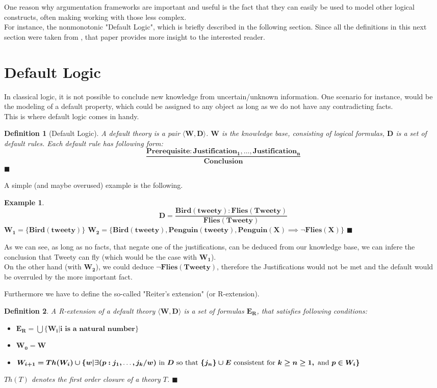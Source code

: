 \documentclass[12pt]{report}
\numberwithin{figure}{chapter}
\theoremstyle{break}
\newtheorem{defn}{Definition}[chapter]
\newtheorem{exmpl}{Example}[chapter]
\newenvironment{mydefn}{\begin{defn}}{$\blacksquare$ \end{defn}}
\newenvironment{myexmpl}{\begin{exmpl}}{$\blacksquare$ \end{exmpl}}
\begin{document}
One reason why argumentation frameworks are important and useful is the fact that they can easily be used to model other
logical constructs, often making working with those less complex.\\
For instance, the nonmonotonic "Default Logic", which is briefly described in the following section.
Since all the definitions in this next section were taken from \cite{Reiter}, that paper provides more insight to the interested reader.

\section{Default Logic}
In classical logic, it is not possible to conclude new knowledge from uncertain/unknown information. One scenario for instance, would be the modeling of a default property,
which could be assigned to any object as long as we do not have any contradicting facts.\\
This is where default logic comes in handy.

\begin{mydefn}[Default Logic]
A default theory is a pair $\bm{\langle W,D \rangle}$.
$\bm{W}$ is the knowledge base, consisting of logical formulas, $\bm{D}$ is a set of \textit{default rules}.
Each default rule has following form: \[\bm{\frac{Prerequisite : Justification_{1},\dots,Justification_{n}}{Conclusion}}\]
\end{mydefn}

A simple (and maybe overused) example is the following.
\begin{myexmpl}
\[\bm{D = \frac{Bird(tweety): Flies(Tweety)}{Flies(Tweety)}}\]
$\bm{W_{1} = \{Bird(tweety)\}}$
$\bm{W_{2} = \{Bird(tweety),Penguin(tweety),Penguin(X) \implies \lnot Flies(X)\}}$
\end{myexmpl}
As we can see, as long as no facts, that negate one of the justifications, can be deduced from our knowledge base, we can infere the conclusion that Tweety can fly
(which would be the case with $\bm{W_{1}}$).\\
On the other hand (with $\bm{W_{2}}$), we could deduce $\bm{\lnot Flies(Tweety)}$, therefore the Justifications would not be met and the default would be overruled by
the more important fact.

Furthermore we have to define the so-called "Reiter's extension" (or R-extension).
\begin{mydefn}
A R-extension of a default theory $\bm{\langle W,D \rangle}$ is a set of formulas $\bm{E_{R}}$, that satisfies following conditions:
\begin{itemize}
	\item{$\bm{E_{R} = \bigcup \{W_{i} \vert i \text{ is a natural number}\}}$}
	\item{$\bm{W_{0} = W}$}
	\item{$\bm{W_{i+1} = Th(W_{i}) \cup \{w \vert \exists(p:j_{1},\text{\dots},j_{k}/w) \text{ in } D \text{ so that } \{j_{n}\} \cup E \text{ consistent for } k \geq n \geq 1,
		\text{ and } p \in W_{i}\}}$}
\end{itemize}
$Th(T)$ denotes the first order closure of a theory $T$.
\end{mydefn}
\end{document}
